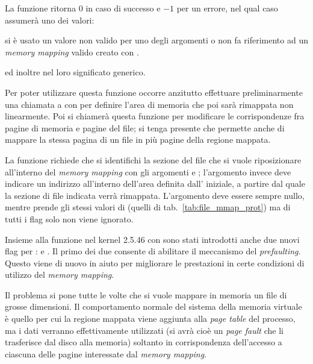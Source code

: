 \begin{funcproto}{
}

{La funzione ritorna $0$ in caso di successo e $-1$ per un errore, nel qual
  caso  assumerà uno dei valori: 
  \begin{errlist}
    \item[\errcode{EINVAL}] si è usato un valore non valido per uno degli
      argomenti o  non fa riferimento ad un \textit{memory
        mapping} valido creato con .
  \end{errlist}
  ed inoltre 
 nel loro significato generico.}
\end{funcproto}

Per poter utilizzare questa funzione occorre anzitutto effettuare
preliminarmente una chiamata a  con  per
definire l'area di memoria che poi sarà rimappata non linearmente. Poi si
chiamerà questa funzione per modificare le corrispondenze fra pagine di
memoria e pagine del file; si tenga presente che 
permette anche di mappare la stessa pagina di un file in più pagine della
regione mappata.

La funzione richiede che si identifichi la sezione del file che si vuole
riposizionare all'interno del \textit{memory mapping} con gli argomenti
 e ; l'argomento  invece deve indicare
un indirizzo all'interno dell'area definita dall' iniziale, a
partire dal quale la sezione di file indicata verrà rimappata. L'argomento
 deve essere sempre nullo, mentre  prende gli stessi
valori di  (quelli di tab.~\ref{tab:file_mmap_prot}) ma di tutti i
flag solo  non viene ignorato.


Insieme alla funzione  nel kernel 2.5.46 con sono
stati introdotti anche due nuovi flag per :  e
.  Il primo dei due consente di abilitare il meccanismo
del \textit{prefaulting}. Questo viene di nuovo in aiuto per migliorare le
prestazioni in certe condizioni di utilizzo del \textit{memory mapping}.

Il problema si pone tutte le volte che si vuole mappare in memoria un file di
grosse dimensioni. Il comportamento normale del sistema della memoria virtuale
è quello per cui la regione mappata viene aggiunta alla \textit{page table}
del processo, ma i dati verranno effettivamente utilizzati (si avrà cioè un
\textit{page fault} che li trasferisce dal disco alla memoria) soltanto in
corrispondenza dell'accesso a ciascuna delle pagine interessate dal
\textit{memory mapping}.

